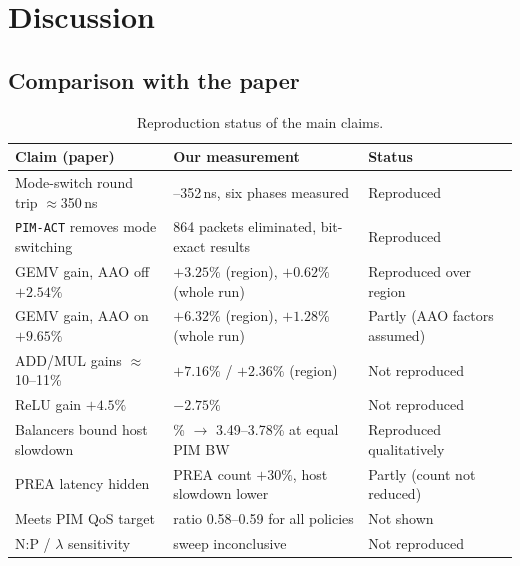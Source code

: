 \documentclass[conference]{IEEEtran}
\newcommand{\cmd}[1]{\texttt{\footnotesize #1}}
\newcommand{\pimact}{\cmd{PIM-ACT}\xspace}
\begin{document}
\section{Discussion}\label{sec:discussion}

\subsection{Comparison with the paper}
\begin{table}[!t]
\centering
\caption{Reproduction status of the main claims.}\label{tab:status}
\footnotesize
\begin{tabularx}{\textwidth}{@{}>{\raggedright\arraybackslash}p{4.1cm}>{\raggedright\arraybackslash}X>{\raggedright\arraybackslash}p{3.1cm}@{}}
\toprule
\textbf{Claim (paper)} & \textbf{Our measurement} & \textbf{Status}\\
\midrule
Mode-switch round trip $\approx$350\,ns & 351--352\,ns, six phases measured & Reproduced\\
\pimact removes mode switching & 4{,}864 packets eliminated, bit-exact results & Reproduced\\
GEMV gain, AAO off $+2.54\%$ & $+3.25\%$ (region), $+0.62\%$ (whole run) & Reproduced over region\\
GEMV gain, AAO on $+9.65\%$ & $+6.32\%$ (region), $+1.28\%$ (whole run) & Partly (AAO factors assumed)\\
ADD/MUL gains $\approx$10--11\% & $+7.16\%$ / $+2.36\%$ (region) & Not reproduced\\
ReLU gain $+4.5\%$ & $-2.75\%$ & Not reproduced\\
Balancers bound host slowdown & 4.99\% $\to$ 3.49--3.78\% at equal PIM BW & Reproduced qualitatively\\
PREA latency hidden & PREA count $+30\%$, host slowdown lower & Partly (count not reduced)\\
Meets PIM QoS target & ratio 0.58--0.59 for all policies & Not shown\\
N:P / $\lambda$ sensitivity & sweep inconclusive & Not reproduced\\
\bottomrule
\end{tabularx}
\end{table}
\end{document}
